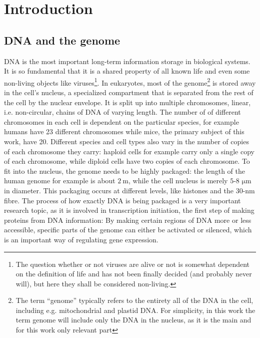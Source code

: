 \documentclass[a4paper,11pt,oneside,final,english,toc=bib,draft]{scrbook}
\begin{document}

\tableofcontents
\clearpage

\mainmatter
\sloppy

% 
\chapter{Introduction} %
\label{cha:introduction}

\section{DNA and the genome} %
\label{sec:dna_and_genome}

DNA is the most important long-term information storage in biological systems. It is so fundamental that it is a shared property of all known life and even some non-living objects like viruses\footnote{The question whether or not viruses are alive or not is somewhat dependent on the definition of life and has not been finally decided (and probably never will), but here they shall be considered non-living.}. In eukaryotes, most of the genome\footnote{The term \enquote{genome} typically refers to the entirety all of the DNA in the cell, including e.g. mitochondrial and plastid DNA. For simplicity, in this work the term genome will include only the DNA in the nucleus, as it is the main and for this work only relevant part} is stored away in the cell's nucleus, a specialized compartment that is separated from the rest of the cell by the nuclear envelope. It is split up into multiple chromosomes, linear, i.e. non-circular, chains of DNA of varying length. The number of of different chromosomes in each cell is dependent on the particular species, for example humans have 23 different chromosomes while mice, the primary subject of this work, have 20. Different species and cell types also vary in the number of copies of each chromosome they carry: haploid cells for example carry only a single copy of each chromosome, while diploid cells have two copies of each chromosome. To fit into the nucleus, the genome needs to be highly packaged: the length of the human genome for example is about \(\SI{2}{\metre}\), while the cell nucleus is merely \(5\)-\(8\) \(\si{\micro\metre}\) in diameter. This packaging occurs at different levels, like histones and the 30-nm fibre. The process of how exactly DNA is being packaged is a very important research topic, as it is involved in transcription initiation, the first step of making proteins from DNA information: By making certain regions of DNA more or less accessible, specific parts of the genome can either be activated or silenced, which is an important way of regulating gene expression. \cite{uzman_essential_2010}
\end{document}
